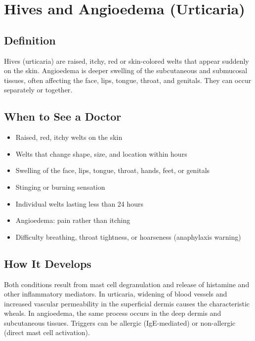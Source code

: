 \chapter{Hives and Angioedema (Urticaria)}

\section*{Definition}
Hives (urticaria) are raised, itchy, red or skin-colored welts that appear suddenly on the skin. Angioedema is deeper swelling of the subcutaneous and submucosal tissues, often affecting the face, lips, tongue, throat, and genitals. They can occur separately or together.

\section*{When to See a Doctor}
\begin{itemize}
\item Raised, red, itchy welts on the skin
\item Welts that change shape, size, and location within hours
\item Swelling of the face, lips, tongue, throat, hands, feet, or genitals
\item Stinging or burning sensation
\item Individual welts lasting less than 24 hours
\item Angioedema: pain rather than itching
\item Difficulty breathing, throat tightness, or hoarseness (anaphylaxis warning)
\end{itemize}

\section*{How It Develops}
Both conditions result from mast cell degranulation and release of histamine and other inflammatory mediators. In urticaria, widening of blood vessels and increased vascular permeability in the superficial dermis causes the characteristic wheals. In angioedema, the same process occurs in the deep dermis and subcutaneous tissues. Triggers can be allergic (IgE-mediated) or non-allergic (direct mast cell activation).

